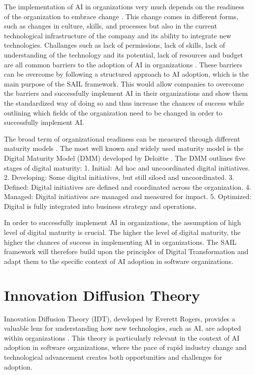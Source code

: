 \documentclass[]{imc-inf}
\begin{document}
The implementation of AI in organizations very much depends on the
readiness of the organization to embrace change \citep{Shrestha2019}. This change comes in
different forms, such as changes in culture, skills, and processes but
also in the current technological infrastructure of the company and its
ability to integrate new technologies. Challanges such as lack of
permissions, lack of skills, lack of understanding of the technology and
its potential, lack of resources and budget are all common barriers to
the adoption of AI in organizations \citep{Bain2024}. These barriers can be overcome by
following a structured approach to AI adoption, which is the main
purpose of the SAIL framework. This would allow companies to overcome
the barriers and successfully implement AI in their organizations and
show them the standardized way of doing so and thus increase the chances
of success while outlining which fields of the organization need to be
changed in order to successfully implement AI.

The broad term of organizational readiness can be measured through
different maturity models \citep{AlAli2022}. The most well known and widely used maturity
model is the Digital Maturity Model (DMM) developed by Deloitte \citep{DeloitteInsights2023}. The DMM
outlines five stages of digital maturity: 1. Initial: Ad hoc and
uncoordinated digital initiatives. 2. Developing: Some digital
initiatives, but still siloed and uncoordinated. 3. Defined: Digital
initiatives are defined and coordinated across the organization. 4.
Managed: Digital initiatives are managed and measured for impact. 5.
Optimized: Digital is fully integrated into business strategy and
operations.

In order to successfully implement AI in organizations, the assumption
of high level of digital maturity is crucial. The higher the level of
digital maturity, the higher the chances of success in implementing AI
in organizations. The SAIL framework will therefore build upon the
principles of Digital Transformation and adapt them to the specific
context of AI adoption in software organizations.

\section{Innovation Diffusion Theory}

Innovation Diffusion Theory (IDT), developed by Everett Rogers, provides
a valuable lens for understanding how new technologies, such as AI, are
adopted within organizations \citep{Rogers2003}. This theory is particularly relevant in
the context of AI adoption in software organizations, where the pace of
rapid industry change and technological advancement creates both
opportunities and challenges for adoption.
\end{document}
